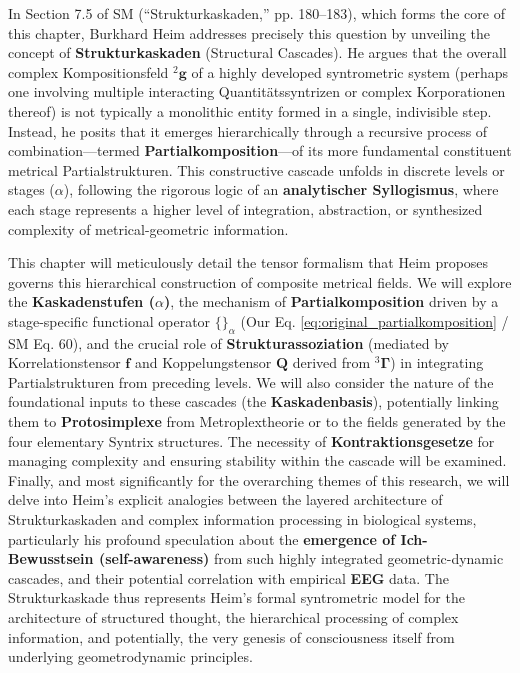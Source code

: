 \documentclass[
    12pt,              %
    a4paper,           %
    headings=normal,   %
    twoside=true,      %
    BCOR=8mm,          %
]{scrbook}
\newcommand{\q}[1]{\enquote{#1}}
\newcommand{\kompositionsfeld}{{}^2\mathbf{g}}
\newcommand{\fundamentalkondensor}{{}^3\bm{\Gamma}}
\newcommand{\korrelationstensor}{\mathbf{f}}
\newcommand{\koppelungstensor}{\mathbf{Q}}
\newcommand{\kaskadenstufe}{\alpha}
\begin{document}
In Section 7.5 of SM (\q{Strukturkaskaden,} pp. 180–183), which forms the core of this chapter, Burkhard Heim addresses precisely this question by unveiling the concept of \textbf{Strukturkaskaden} (Structural Cascades). He argues that the overall complex Kompositionsfeld \(\kompositionsfeld\) of a highly developed syntrometric system (perhaps one involving multiple interacting Quantitätssyntrizen or complex Korporationen thereof) is not typically a monolithic entity formed in a single, indivisible step. Instead, he posits that it emerges hierarchically through a recursive process of combination—termed \textbf{Partialkomposition}—of its more fundamental constituent metrical Partialstrukturen. This constructive cascade unfolds in discrete levels or stages (\(\kaskadenstufe\)), following the rigorous logic of an \textbf{analytischer Syllogismus}, where each stage represents a higher level of integration, abstraction, or synthesized complexity of metrical-geometric information.

This chapter will meticulously detail the tensor formalism that Heim proposes governs this hierarchical construction of composite metrical fields. We will explore the \textbf{Kaskadenstufen (\(\kaskadenstufe\))}, the mechanism of \textbf{Partialkomposition} driven by a stage-specific functional operator \(\{\}_\alpha\) (Our Eq. \eqref{eq:original_partialkomposition} / SM Eq. 60), and the crucial role of \textbf{Strukturassoziation} (mediated by Korrelationstensor \(\korrelationstensor\) and Koppelungstensor \(\koppelungstensor\) derived from \(\fundamentalkondensor\)) in integrating Partialstrukturen from preceding levels. We will also consider the nature of the foundational inputs to these cascades (the \textbf{Kaskadenbasis}), potentially linking them to \textbf{Protosimplexe} from Metroplextheorie or to the fields generated by the four elementary Syntrix structures. The necessity of \textbf{Kontraktionsgesetze} for managing complexity and ensuring stability within the cascade will be examined. Finally, and most significantly for the overarching themes of this research, we will delve into Heim’s explicit analogies between the layered architecture of Strukturkaskaden and complex information processing in biological systems, particularly his profound speculation about the \textbf{emergence of Ich-Bewusstsein (self-awareness)} from such highly integrated geometric-dynamic cascades, and their potential correlation with empirical \textbf{EEG} data. The Strukturkaskade thus represents Heim's formal syntrometric model for the architecture of structured thought, the hierarchical processing of complex information, and potentially, the very genesis of consciousness itself from underlying geometrodynamic principles.
\end{document}
